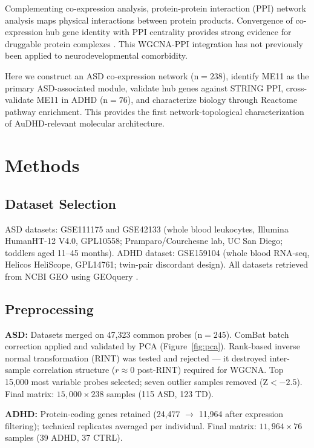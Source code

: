 \documentclass[10pt,twocolumn]{article}
\begin{document}
Complementing co-expression analysis, protein-protein interaction (PPI) network analysis
maps physical interactions between protein products. Convergence of co-expression hub gene
identity with PPI centrality provides strong evidence for druggable protein complexes
\citep{nangraj2020}. This WGCNA-PPI integration has not previously been applied to
neurodevelopmental comorbidity.

Here we construct an ASD co-expression network (n$=238$), identify ME11 as the primary
ASD-associated module, validate hub genes against STRING PPI, cross-validate ME11 in ADHD
(n$=76$), and characterize biology through Reactome pathway enrichment. This provides the
first network-topological characterization of AuDHD-relevant molecular architecture.

\section{Methods}

\subsection{Dataset Selection}

ASD datasets: GSE111175 and GSE42133 (whole blood leukocytes, Illumina HumanHT-12 V4.0,
GPL10558; Pramparo/Courchesne lab, UC San Diego; toddlers aged 11--45 months). ADHD
dataset: GSE159104 (whole blood RNA-seq, Helicos HeliScope, GPL14761; twin-pair discordant
design). All datasets retrieved from NCBI GEO using GEOquery \citep{davis2007}.

\subsection{Preprocessing}

\textbf{ASD:} Datasets merged on 47,323 common probes (n$=245$). ComBat batch correction
\citep{johnson2007} applied and validated by PCA (Figure~\ref{fig:pca}). Rank-based
inverse normal transformation (RINT) was tested and rejected --- it destroyed inter-sample
correlation structure ($r\approx0$ post-RINT) required for WGCNA. Top 15,000 most variable
probes selected; seven outlier samples removed (Z$<-2.5$). Final matrix:
$15{,}000 \times 238$ samples (115 ASD, 123 TD).

\textbf{ADHD:} Protein-coding genes retained (24,477 $\rightarrow$ 11,964 after expression
filtering); technical replicates averaged per individual. Final matrix:
$11{,}964 \times 76$ samples (39 ADHD, 37 CTRL).
\end{document}
